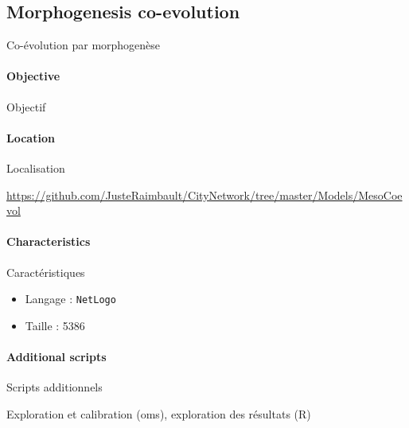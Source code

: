 

\subsection{Morphogenesis co-evolution}{Co-évolution par morphogenèse}

\paragraph{Objective}{Objectif}



\paragraph{Location}{Localisation}

\url{https://github.com/JusteRaimbault/CityNetwork/tree/master/Models/MesoCoevol}

\paragraph{Characteristics}{Caractéristiques}

\begin{itemize}
\item Langage : \texttt{NetLogo}
\item Taille : 5386
\end{itemize}






\paragraph{Additional scripts}{Scripts additionnels}

Exploration et calibration (oms), exploration des résultats (R)





